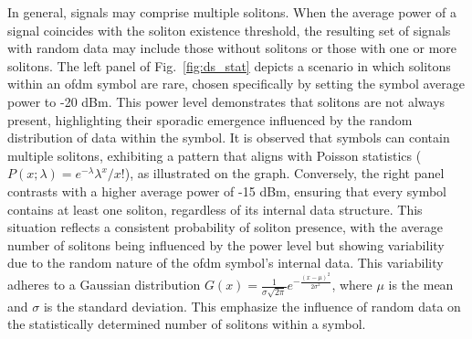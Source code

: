

In general, signals may comprise multiple solitons. When the average power of a signal coincides with the soliton existence threshold, the resulting set of signals with random data may include those without solitons or those with one or more solitons.
The left panel of Fig.~\ref{fig:ds_stat} depicts a scenario in which solitons within an \acrshort{ofdm} symbol are rare, chosen specifically by setting the symbol average power to -20 dBm. This power level demonstrates that solitons are not always present, highlighting their sporadic emergence influenced by the random distribution of data within the symbol. It is observed that symbols can contain multiple solitons, exhibiting a pattern that aligns with Poisson statistics ($P(x;\lambda) = e^{-\lambda} \lambda^x / x!$), as illustrated on the graph. Conversely, the right panel contrasts with a higher average power of -15 dBm, ensuring that every symbol contains at least one soliton, regardless of its internal data structure. This situation reflects a consistent probability of soliton presence, with the average number of solitons being influenced by the power level but showing variability due to the random nature of the \acrshort{ofdm} symbol's internal data. This variability adheres to a Gaussian distribution $G(x) = \frac{1}{\sigma \sqrt{2 \pi}} e^{-\frac{(x-\mu)^2}{2\sigma^2}}$, where $\mu$ is the mean and $\sigma$ is the standard deviation. This emphasize the influence of random data on the statistically determined number of solitons within a symbol.


